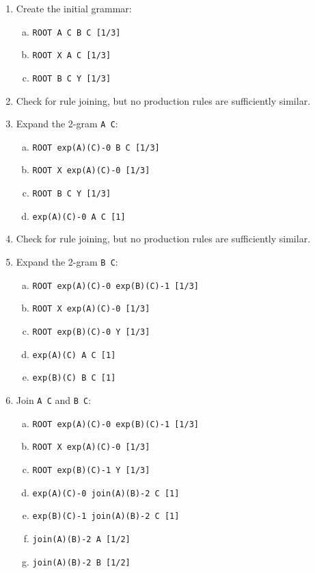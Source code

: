 \documentclass[paper=a4, fontsize=11pt]{scrartcl} %
\numberwithin{equation}{section} %
\numberwithin{figure}{section} %
\numberwithin{table}{section} %
\begin{document}
\begin{enumerate}[1.]
\item Create the initial grammar:
\begin{enumerate}[(a)]
\item \texttt{ROOT \textrightarrow A C B C [1/3]}
\item \texttt{ROOT \textrightarrow X A C [1/3]}
\item \texttt{ROOT \textrightarrow B C Y [1/3]}
\end{enumerate}

\item Check for rule joining, but no production rules are sufficiently similar.

\item Expand the 2-gram \texttt{A C}:
\begin{enumerate}[(a)]
\item \texttt{ROOT \textrightarrow exp(A)(C)-0 B C [1/3]}
\item \texttt{ROOT \textrightarrow X exp(A)(C)-0 [1/3]}
\item \texttt{ROOT \textrightarrow B C Y [1/3]}
\item \texttt{exp(A)(C)-0 \textrightarrow A C  [1]}
\end{enumerate}

\item Check for rule joining, but no production rules are sufficiently similar.

\item Expand the 2-gram \texttt{B C}:
\begin{enumerate}[(a)]
\item \texttt{ROOT \textrightarrow exp(A)(C)-0 exp(B)(C)-1 [1/3]}
\item \texttt{ROOT \textrightarrow X exp(A)(C)-0 [1/3]}
\item \texttt{ROOT \textrightarrow exp(B)(C)-0 Y [1/3]}
\item \texttt{exp(A)(C) \textrightarrow A C  [1]}
\item \texttt{exp(B)(C) \textrightarrow B C  [1]}
\end{enumerate}

\item Join \texttt{A C} and \texttt{B C}:
\begin{enumerate}[(a)]
\item \texttt{ROOT \textrightarrow exp(A)(C)-0 exp(B)(C)-1 [1/3]}
\item \texttt{ROOT \textrightarrow X exp(A)(C)-0 [1/3]}
\item \texttt{ROOT \textrightarrow exp(B)(C)-1 Y [1/3]}
\item \texttt{exp(A)(C)-0 \textrightarrow join(A)(B)-2 C  [1]}
\item \texttt{exp(B)(C)-1 \textrightarrow join(A)(B)-2 C  [1]}
\item \texttt{join(A)(B)-2 \textrightarrow A  [1/2]}
\item \texttt{join(A)(B)-2 \textrightarrow B  [1/2]}
\end{enumerate}


\end{enumerate}
\end{document}
